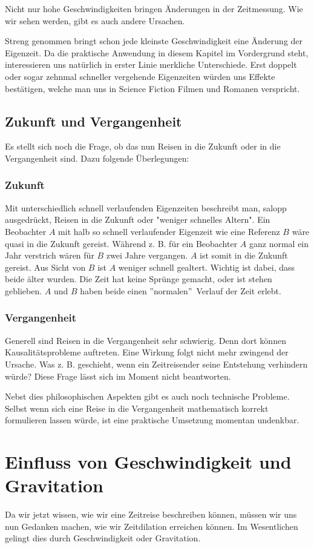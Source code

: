 \begin{refsection}
Nicht nur hohe Geschwindigkeiten bringen Änderungen in der Zeitmessung. Wie wir sehen werden, gibt es auch andere Ursachen.

Streng genommen bringt schon jede kleinste Geschwindigkeit eine Änderung der Eigenzeit. Da die praktische Anwendung in diesem Kapitel im Vordergrund steht, interessieren uns natürlich in erster Linie merkliche Unterschiede. Erst doppelt oder sogar zehnmal schneller vergehende Eigenzeiten w\"urden uns Effekte best\"atigen, welche man uns in Science Fiction Filmen und Romanen verspricht.

\subsection{Zukunft und Vergangenheit}
Es stellt sich noch die Frage, ob das nun Reisen in die Zukunft oder in die Vergangenheit sind. Dazu folgende Überlegungen:

\subsubsection{Zukunft}
Mit unterschiedlich schnell verlaufenden Eigenzeiten beschreibt man, salopp ausgedrückt, Reisen in die Zukunft oder "weniger schnelles Altern". Ein Beobachter $A$ mit halb so schnell verlaufender Eigenzeit wie eine Referenz $B$ wäre quasi in die Zukunft gereist.
Während z. B. für ein Beobachter $A$ ganz normal ein Jahr verstrich wären für $B$ zwei Jahre vergangen. $A$ ist somit in die Zukunft gereist. Aus Sicht von $B$ ist $A$ weniger schnell gealtert. Wichtig ist dabei, dass beide älter wurden. Die Zeit hat keine Sprünge gemacht, oder ist stehen geblieben. $A$ und $B$ haben beide einen ''normalen''~Verlauf der Zeit erlebt.

\subsubsection{Vergangenheit}
Generell sind Reisen in die Vergangenheit sehr schwierig. Denn dort können Kausalitätsprobleme auftreten. Eine Wirkung folgt nicht mehr zwingend der Ursache. Was z. B. geschieht, wenn ein Zeitreisender seine Entstehung verhindern würde? Diese Frage lässt sich im Moment nicht beantworten. 

Nebst dies philosophischen Aspekten gibt es auch noch technische Probleme. Selbst wenn sich eine Reise in die Vergangenheit mathematisch korrekt formulieren lassen würde, ist eine praktische Umsetzung momentan undenkbar.

\section{Einfluss von Geschwindigkeit und Gravitation}
Da wir jetzt wissen, wie wir eine Zeitreise beschreiben können, müssen wir uns nun Gedanken machen, wie wir Zeitdilation erreichen können. Im Wesentlichen gelingt dies durch Geschwindigkeit oder Gravitation. 

\end{refsection}
